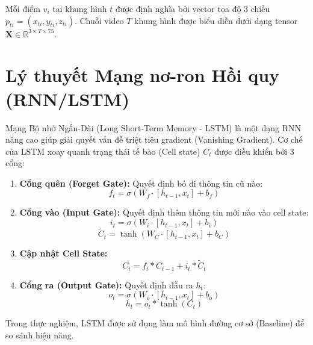 \documentclass[a4paper,12pt]{report}
\begin{document}
Mỗi điểm $v_i$ tại khung hình $t$ được định nghĩa bởi vector tọa độ 3 chiều $p_{ti} = (x_{ti}, y_{ti}, z_{ti})$. Chuỗi video $T$ khung hình được biểu diễn dưới dạng tensor $\mathbf{X} \in \mathbb{R}^{3 \times T \times 75}$.

\section{Lý thuyết Mạng nơ-ron Hồi quy (RNN/LSTM)}
Mạng Bộ nhớ Ngắn-Dài (Long Short-Term Memory - LSTM) là một dạng RNN nâng cao giúp giải quyết vấn đề triệt tiêu gradient (Vanishing Gradient).
Cơ chế của LSTM xoay quanh trạng thái tế bào (Cell state) $C_t$ được điều khiển bởi 3 cổng:
\begin{enumerate}
    \item \textbf{Cổng quên (Forget Gate):} Quyết định bỏ đi thông tin cũ nào:
    \begin{equation}
        f_t = \sigma(W_f \cdot [h_{t-1}, x_t] + b_f)
    \end{equation}
    \item \textbf{Cổng vào (Input Gate):} Quyết định thêm thông tin mới nào vào cell state:
    \begin{equation}
        i_t = \sigma(W_i \cdot [h_{t-1}, x_t] + b_i)
    \end{equation}
    \begin{equation}
        \tilde{C}_t = \tanh(W_C \cdot [h_{t-1}, x_t] + b_C)
    \end{equation}
    \item \textbf{Cập nhật Cell State:}
    \begin{equation}
        C_t = f_t \ast C_{t-1} + i_t \ast \tilde{C}_t
    \end{equation}
    \item \textbf{Cổng ra (Output Gate):} Quyết định đầu ra $h_t$:
    \begin{equation}
        o_t = \sigma(W_o \cdot [h_{t-1}, x_t] + b_o)
    \end{equation}
    \begin{equation}
        h_t = o_t \ast \tanh(C_t)
    \end{equation}
\end{enumerate}
Trong thực nghiệm, LSTM được sử dụng làm mô hình đường cơ sở (Baseline) để so sánh hiệu năng.
\end{document}
